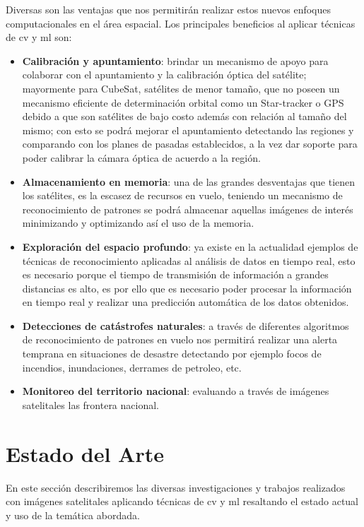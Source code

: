 Diversas son las ventajas que nos permitirán realizar estos nuevos enfoques computacionales en el área espacial. Los principales beneficios al aplicar técnicas de \ac{cv} y \ac{ml} son: 
\begin{itemize}
\item \textbf{Calibración y apuntamiento}: brindar un mecanismo de apoyo para colaborar con el apuntamiento y la calibración óptica del satélite; mayormente para CubeSat, satélites de menor tamaño, que no poseen un mecanismo eficiente de determinación orbital como un Star-tracker o GPS debido a que son satélites de bajo costo además con relación al tamaño del mismo; con esto se podrá mejorar el apuntamiento detectando las regiones y comparando con los planes de pasadas  establecidos, a la vez dar soporte para poder calibrar la cámara óptica de acuerdo a la región.
\item \textbf{Almacenamiento en memoria}: una de las grandes desventajas que tienen los satélites, es la escasez de recursos en vuelo, teniendo un mecanismo de reconocimiento de patrones se podrá almacenar aquellas imágenes de interés minimizando y optimizando  así el uso de la memoria.
\item \textbf{Exploración del espacio profundo}: ya existe en la actualidad ejemplos de técnicas de reconocimiento aplicadas al análisis de datos en tiempo real, esto es necesario  porque el tiempo de transmisión de información a grandes distancias es alto, es por ello que es necesario poder procesar la información en tiempo real y realizar una predicción automática de los datos obtenidos.
\item \textbf{Detecciones de catástrofes naturales}: a través de diferentes algoritmos de reconocimiento de patrones en vuelo nos permitirá realizar una alerta temprana en situaciones de desastre detectando por ejemplo focos de incendios, inundaciones, derrames de petroleo, etc.
\item \textbf{Monitoreo del territorio nacional}: evaluando a través de imágenes satelitales las frontera nacional.
\end{itemize}

\section{Estado del Arte} \label{sec:estadodelarte}

En este sección describiremos las diversas investigaciones y trabajos realizados con imágenes satelitales aplicando técnicas de \ac{cv} y \ac{ml} resaltando el estado actual y uso de la temática abordada.

